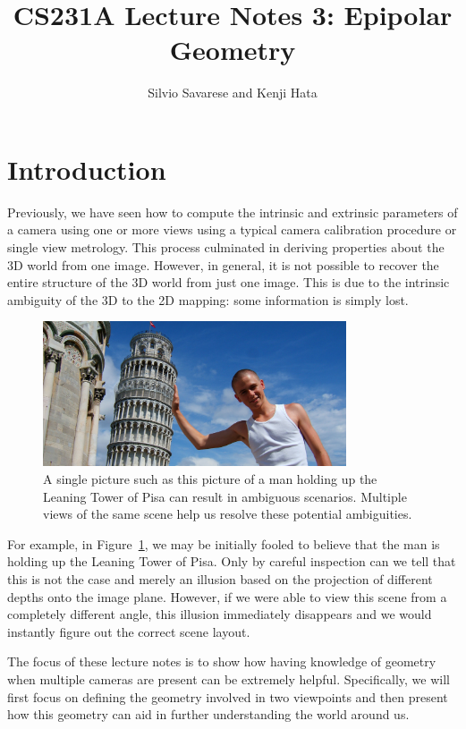 \documentclass[a4paper, 12pt]{article}
\title{CS231A Lecture Notes 3: Epipolar Geometry}
\author{Silvio Savarese and Kenji Hata}
\date{}
\begin{document}
\maketitle

\section{Introduction}
Previously, we have seen how to compute the intrinsic and extrinsic parameters of a camera using one or more views using a typical camera calibration procedure or single view metrology. This process culminated in deriving properties about the 3D world from one image. However, in general, it is not possible to recover the entire structure of the 3D world from just one image. This is due to the intrinsic ambiguity of the 3D to the 2D mapping: some information is simply lost.

\begin{figure}[h!]
\centering
\includegraphics[width=0.8\textwidth]{figures/pisa.jpg}
\caption{A single picture such as this picture of a man holding up the Leaning Tower of Pisa can result in ambiguous scenarios. Multiple views of the same scene help us resolve these potential ambiguities.}
\label{fig:pisa}
\end{figure}

For example, in Figure~\ref{fig:pisa}, we may be initially fooled to believe that the man is holding up the Leaning Tower of Pisa. Only by careful inspection can we tell that this is not the case and merely an illusion based on the projection of different depths onto the image plane. However, if we were able to view this scene from a completely different angle, this illusion immediately disappears and we would instantly figure out the correct scene layout. 

The focus of these lecture notes is to show how having knowledge of geometry when multiple cameras are present can be extremely helpful. Specifically, we will first focus on defining the geometry involved in two viewpoints and then present how this geometry can aid in further understanding the world around us. 
\end{document}
